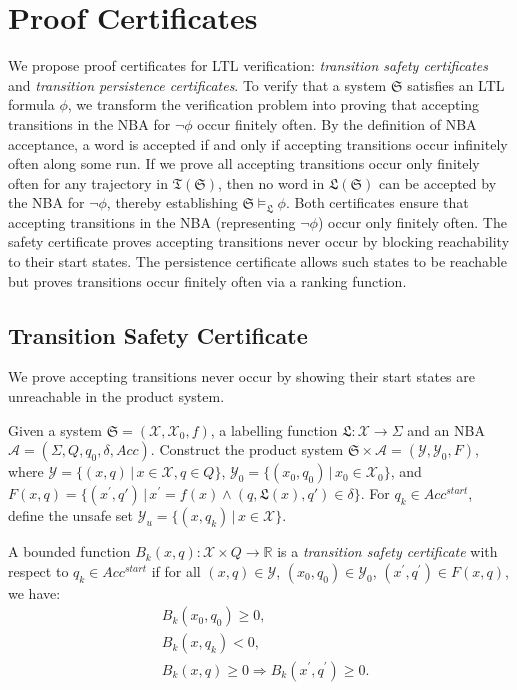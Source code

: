 \section{Proof Certificates}
\label{sec:method}
We propose proof certificates for LTL verification: \emph{transition safety certificates} and \emph{transition persistence certificates}. To verify that a system $\mathfrak{S}$ satisfies an LTL formula $\phi$, we transform the verification problem into proving that accepting transitions in the NBA for $\neg\phi$ occur finitely often. By the definition of NBA acceptance, a word is accepted if and only if accepting transitions occur infinitely often along some run. If we prove all accepting transitions occur only finitely often for any trajectory in $\mathfrak{T}(\mathfrak{S})$, then no word in $\mathfrak{L}(\mathfrak{S})$ can be accepted by the NBA for $\neg\phi$, thereby establishing $\mathfrak{S} \models_{\mathfrak{L}} \phi$. Both certificates ensure that accepting transitions in the NBA (representing $\neg\phi$) occur only finitely often. The safety certificate proves accepting transitions never occur by blocking reachability to their start states. The persistence certificate allows such states to be reachable but proves transitions occur finitely often via a ranking function.

\subsection{Transition Safety Certificate}

We prove accepting transitions never occur by showing their start states are unreachable in the product system.

\begin{definition}
  \label{transition-safety-certificate-definition}
  Given a system $\mathfrak{S} = (\mathcal{X}, \mathcal{X}_0, f)$, a labelling function $\mathfrak{L}:\mathcal{X} \rightarrow \Sigma$ and an NBA $\mathcal{A}=(\Sigma, Q, q_0, \delta, Acc)$. Construct the product system $\mathfrak{S} \times \mathcal{A} = (\mathcal{Y}, \mathcal{Y}_0, F)$, where $\mathcal{Y} = \{(x, q) \,|\, x \in \mathcal{X}, q \in Q \}$, $\mathcal{Y}_0 = \{ (x_0, q_0) \,|\, x_0 \in \mathcal{X}_0 \}$, and $F(x,q) = \{(x^{\prime}, q') \,|\, x^{\prime} = f(x) \land (q, \mathfrak{L}(x), q') \in \delta\}$. For $q_k \in Acc^{start}$, define the unsafe set $\mathcal{Y}_u = \{(x, q_k) \,|\, x \in \mathcal{X}\}$.

  A bounded function $B_{k}(x, q): \mathcal{X} \times Q \rightarrow \mathbb{R}$ is a \emph{transition safety certificate} with respect to $q_k \in Acc^{start}$ if for all $(x,q) \in \mathcal{Y}$, $(x_0, q_0) \in \mathcal{Y}_0$, $(x^{\prime}, q^{\prime}) \in F(x, q)$, we have:
  \begin{align}
    &B_{k}(x_0, q_0) \geq 0, \label{btsc1} \\
    &B_{k}(x, q_k) < 0, \label{btsc2} \\
    &B_{k}(x, q) \geq 0 \Rightarrow B_{k}(x^{\prime}, q^{\prime}) \geq 0. \label{btsc3}
  \end{align}
\end{definition}

